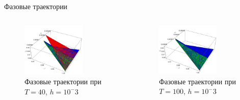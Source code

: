 \documentclass[ignoreonframetext,unicode]{beamer}
\begin{document}
\begin{frame}{Фазовые траектории}
	
	\begin{columns}
	
	\begin{figure}[!htbp]
		\centering
		\includegraphics[width=0.7\textwidth]{T40-0}%
		\caption{Фазовые траектории при $T = 40$, $h = 10^-3$}
		\vspace*{-2mm}
		\label{T40-0}
	\end{figure}

	\begin{figure}[!htbp]
		\centering
		\includegraphics[width=0.7\textwidth]{T100-0}%
		\caption{Фазовые траектории при $T = 100$, $h = 10^-3$}
		\vspace*{-2mm}
		\label{T100-0}
	\end{figure}


\end{columns}
\end{frame}
\end{document}
